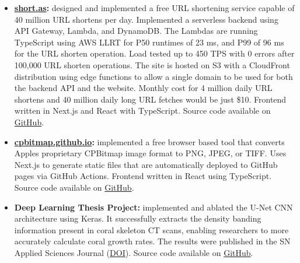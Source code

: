 \vspace{-1.1em}


\vspace{0.2em}

\begin{cvparagraph}

\begin{itemize}[leftmargin=*]
    \itemsep-0.6em
    \item{\textbf{\href{https://short.as}{short.as}:} designed and implemented a free URL shortening service capable of 40 million URL shortens per day. Implemented a serverless backend using API Gateway, Lambda, and DynamoDB. The Lambdas are running TypeScript using AWS LLRT for P50 runtimes of 23 ms, and P99 of 96 ms for the URL shorten operation. Load tested up to 450 TPS with 0 errors after 100,000 URL shorten operations. The site is hosted on S3 with a CloudFront distribution using edge functions to allow a single domain to be used for both the backend API and the website. Monthly cost for 4 million daily URL shortens and 40 million daily long URL fetches would be just \$10. Frontend written in Next.js and React with TypeScript. Source code available on \href{https://github.com/ainsleyrutterford/short.as}{GitHub}.}
    \item{\textbf{\href{https://cpbitmap.github.io/}{cpbitmap.github.io}:} implemented a free browser based tool that converts Apple\textquotesingle s proprietary CPBitmap image format to PNG, JPEG, or TIFF. Uses Next.js to generate static files that are automatically deployed to GitHub pages via GitHub Actions. Frontend written in React using TypeScript. Source code available on \href{https://github.com/cpbitmap/cpbitmap.github.io}{GitHub}.}
    \item{\textbf{Deep Learning Thesis Project:} implemented and ablated the U-Net CNN architecture using Keras. It successfully extracts the density banding information present in coral skeleton CT scans, enabling researchers to more accurately calculate coral growth rates. The results were published in the SN Applied Sciences Journal (\href{https://doi.org/10.1007/s42452-021-04912-x}{DOI}). Source code available on \href{https://github.com/ainsleyrutterford/Thesis}{GitHub}.}

\end{itemize}
\end{cvparagraph}
